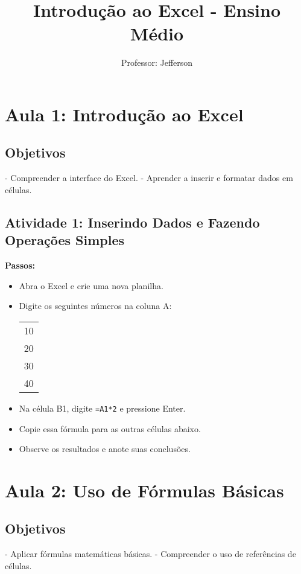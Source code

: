 \documentclass[12pt]{article}
\title{Introdução ao Excel - Ensino Médio}
\author{Professor: Jefferson}
\date{}
\begin{document}
\maketitle

\section*{Aula 1: Introdução ao Excel}
\subsection*{Objetivos}
- Compreender a interface do Excel.
- Aprender a inserir e formatar dados em células.

\subsection*{Atividade 1: Inserindo Dados e Fazendo Operações Simples}
\textbf{Passos:}
\begin{itemize}
    \item Abra o Excel e crie uma nova planilha.
    \item Digite os seguintes números na coluna A:
    \begin{center}
        \begin{tabular}{|c|}
        \hline
        10 \\
        20 \\
        30 \\
        40 \\
        \hline
        \end{tabular}
    \end{center}
    \item Na célula B1, digite \texttt{=A1*2} e pressione Enter.
    \item Copie essa fórmula para as outras células abaixo.
    \item Observe os resultados e anote suas conclusões.
\end{itemize}

\section*{Aula 2: Uso de Fórmulas Básicas}
\subsection*{Objetivos}
- Aplicar fórmulas matemáticas básicas.
- Compreender o uso de referências de células.
\end{document}
